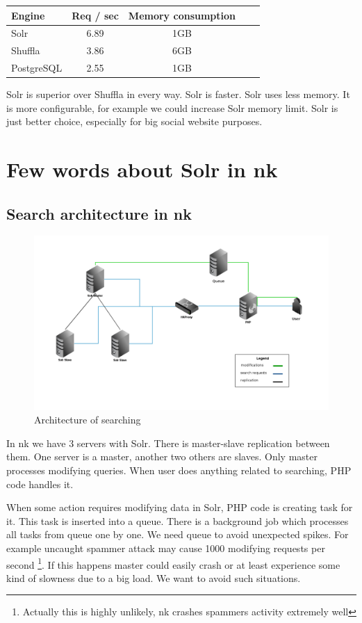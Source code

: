 \documentclass[10pt,a4paper]{article}
\begin{document}
\begin{tabular}{|l|c|c|c|c|}
\hline Engine & Req / sec & Memory consumption \\
\hline Solr & 6.89 & 1GB \\
\hline Shuffla & 3.86 & 6GB  \\
\hline PostgreSQL & 2.55 & 1GB \\
\hline 
\end{tabular}

Solr is superior over Shuffla in every way. Solr is faster. Solr uses less memory. It is more configurable, for example we could increase Solr memory limit. Solr is just better choice, especially for big social website purposes. 

\section{Few words about Solr in nk}

\subsection{Search architecture in nk}

\begin{figure}
\centering
  \includegraphics[width=12cm]{architektura_wyszukiwania}
  \caption{Architecture of searching}
  \label{fig:architektura_wyszukiwania}
\end{figure}

In nk we have 3 servers with Solr. There is master-slave replication between them. One server is a master, another two others are slaves. Only master processes modifying queries. When user does anything related to searching, PHP code handles it.

When some action requires modifying data in Solr, PHP code is creating task for it. This task is inserted into a queue. There is a background job which processes all tasks from queue one by one. We need queue to avoid unexpected spikes. For example uncaught spammer attack may cause 1000 modifying requests per second \footnote{Actually this is highly unlikely, nk crashes spammers activity extremely well}. If this happens master could easily crash or at least experience some kind of slowness due to a big load. We want to avoid such situations. 
\end{document}
